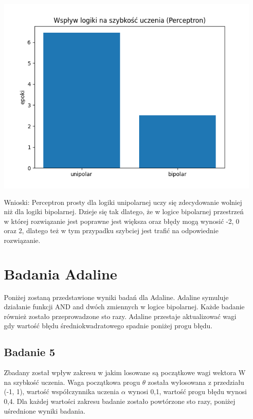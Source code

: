 \documentclass{article}
\begin{document}
\begin{center}
\includegraphics[scale=0.8]{per_exp4.png}
\end{center}

Wnioski: Perceptron prosty dla logiki unipolarnej uczy się zdecydowanie wolniej niż dla logiki bipolarnej. Dzieje się tak dlatego, że w logice bipolarnej przestrzeń w której rozwiązanie jest poprawne jest większa oraz błędy mogą wynosić -2, 0 oraz 2, dlatego też w tym przypadku szybciej jest trafić na odpowiednie rozwiązanie.\\

\newpage
\section{Badania Adaline}

Poniżej zostaną przedstawione wyniki badań dla Adaline. Adaline symuluje działanie funkcji AND and dwóch zmiennych w logice bipolarnej. Każde badanie również zostało przeprowadzone sto razy. Adaline przestaje aktualizować wagi gdy wartość błędu średniokwadratowego spadnie poniżej progu błędu.

\subsection{Badanie 5}

Zbadany został wpływ zakresu w jakim losowane są początkowe wagi wektora W na szybkość uczenia. Waga początkowa progu $\theta$ została wylosowana z przedziału (-1, 1), wartość współczynnika uczenia $\alpha$ wynosi 0,1, wartość progu błędu wynosi 0,4. Dla każdej wartości zakresu badanie zostało powtórzone sto razy, poniżej uśrednione wyniki badania.\\
\end{document}

